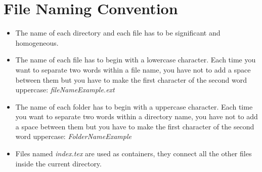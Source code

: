 \documentclass[12pt]{article}
\begin{document}
\section{File Naming Convention}
\begin{itemize}
  \item The name of each directory and each file has to be significant and homogeneous.
  \item The name of each file has to begin with a lowercase character. Each time you want to separate two words within a file name, you have not to add a space between them but you have to make the first character of the second word uppercase: \textit{fileNameExample.ext}
  \item The name of each folder has to begin with a uppercase character. Each time you want to separate two words within a directory name, you have not to add a space between them but you have to make the first character of the second word uppercase: \textit{FolderNameExample}
   \item Files named \textit{index.tex} are used as containers, they connect all the other files inside the current directory.
\end{itemize}
\end{document}
